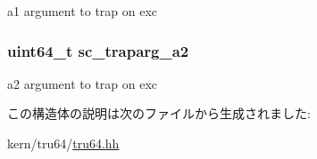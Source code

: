 a1 argument to trap on exc \hypertarget{structTru64_1_1sigcontext_aeb3bf4e999feccefabeb886ebd6aa8f8}{
\subsubsection[{sc\_\-traparg\_\-a2}]{\setlength{\rightskip}{0pt plus 5cm}uint64\_\-t {\bf sc\_\-traparg\_\-a2}}}
\label{structTru64_1_1sigcontext_aeb3bf4e999feccefabeb886ebd6aa8f8}


a2 argument to trap on exc 

この構造体の説明は次のファイルから生成されました:\begin{DoxyCompactItemize}
\item 
kern/tru64/\hyperlink{kern_2tru64_2tru64_8hh}{tru64.hh}\end{DoxyCompactItemize}
